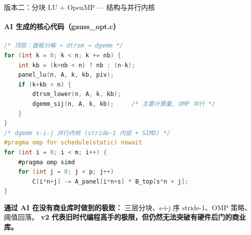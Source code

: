 \documentclass[12pt,aspectratio=169]{beamer}
\begin{document}
\begin{frame}[fragile]{版本二：分块 LU + OpenMP — 结构与并行内核}
\framesubtitle{AI 生成的核心代码（gauss\_opt.c）}

\begin{lstlisting}[language=C,basicstyle=\ttfamily\scriptsize,belowskip=-2pt,numbers=none,aboveskip=0pt]
/* 顶层：面板分解 → dtrsm → dgemm */
for (int k = 0; k < n; k += nb) {
    int kb = (k+nb < n) ? nb : (n-k);
    panel_lu(n, A, k, kb, piv);
    if (k+kb < n) {
        dtrsm_lower(n, A, k, kb);
        dgemm_sij(n, A, k, kb);     /* 主要计算量, OMP 并行 */
    }
}
/* dgemm s-i-j 并行内核 (stride-1 内层 + SIMD) */
#pragma omp for schedule(static) nowait
for (int i = 0; i < m; i++) {
    #pragma omp simd
    for (int j = 0; j < p; j++)
        C[i*n+j] -= A_panel[i*n+s] * B_top[s*n + j];
}
\end{lstlisting}

\vspace{2pt}
\footnotesize
\textbf{通过 AI 在没有商业库时做到的极致：} 三层分块、s-i-j 序 stride-1、OMP 策略、阈值回落。
\textbf{v2 代表旧时代编程高手的极限，但仍然无法突破有硬件后门的商业库。}
\end{frame}
\end{document}
